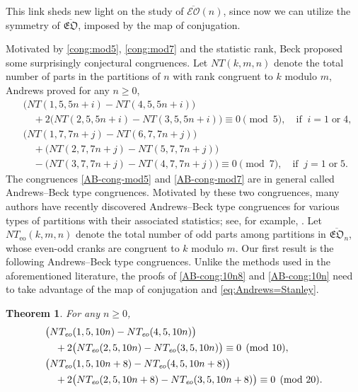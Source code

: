 \documentclass[12pt,reqno]{amsart}
\numberwithin{equation}{section}
\theoremstyle{plain}
\newtheorem{theorem}{Theorem}[section]
\theoremstyle{definition}
\begin{document}
This link sheds new light on the study of $\overline{\mathcal{EO}}(n)$, since now we can utilize the symmetry
of $\overline{\mathfrak{EO}}$, imposed by the map of conjugation.

Motivated by \eqref{cong:mod5}, \eqref{cong:mod7} and the statistic rank, Beck proposed some surprisingly
conjectural congruences. Let $NT(k,m,n)$ denote the total number of parts in the partitions of $n$ with rank
congruent to $k$ modulo $m$, Andrews \cite[Theorems 1 and 2]{and4} proved for any $n\geq0$,
\begin{align}
 &\big(NT(1,5,5n+i)-NT(4,5,5n+i)\big)\nonumber\\
 &\quad+2\big(NT(2,5,5n+i)-NT(3,5,5n+i)\big)\equiv0\pmod{5},\quad\textrm{if}
\;\;i=1\;\textrm{or}\;4,\label{AB-cong-mod5}\\
 &\big(NT(1,7,7n+j)-NT(6,7,7n+j)\big)\nonumber\\
 &\quad+\big(NT(2,7,7n+j)-NT(5,7,7n+j)\big)\nonumber\\
 &\quad-\big(NT(3,7,7n+j)-NT(4,7,7n+j)\big)\equiv0\pmod{7},\quad\textrm{if}
\;\;j=1\;\textrm{or}\;5.\label{AB-cong-mod7}
\end{align}
The congruences \eqref{AB-cong-mod5} and \eqref{AB-cong-mod7} are in general called Andrews--Beck type
congruences. Motivated by these two congruences, many authors have recently discovered Andrews--Beck type
congruences for various types of partitions with their associated statistics; see, for example,
\cite{Che1, Che22a, Che22b, CMO, DT22a, DT22b, JLX22, Kim22, LPT21, Mao22a, Mao22b, Mao23, Yao22}. Let
$NT_{\textrm{eo}}(k,m,n)$ denote the total number of odd parts among partitions in
$\overline{\mathfrak{EO}}_n$, whose even-odd cranks are congruent to $k$ modulo $m$. Our first result is the
following Andrews--Beck type congruences. Unlike the methods used in the aforementioned literature, the
proofs of \eqref{AB-cong:10n8} and \eqref{AB-cong:10n} need to take advantage of the map of conjugation and
\eqref{eq:Andrews=Stanley}.

\begin{theorem}\label{THM:AB-cong}
For any $n\geq0$,
\begin{align}
&\big(NT_{\emph{eo}}(1,5,10n)-NT_{\emph{eo}}(4,5,10n)\big)\notag\\
&\quad+2\big(NT_{\emph{eo}}(2,5,10n)-NT_{\emph{eo}}(3,5,10n)\big)\equiv0\pmod{10},\label{AB-cong:10n8}\\
&\big(NT_{\emph{eo}}(1,5,10n+8)-NT_{\emph{eo}}(4,5,10n+8)\big)\notag\\
&\quad+2\big(NT_{\emph{eo}}(2,5,10n+8)-NT_{\emph{eo}}(3,5,10n+8)\big)\equiv0\pmod{20}.\label{AB-cong:10n}
\end{align}
\end{theorem}
\end{document}
